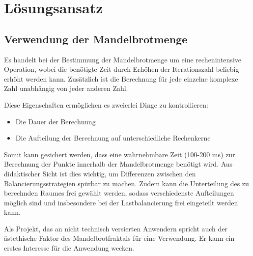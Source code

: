 \section{Lösungsansatz}

\subsection{Verwendung der Mandelbrotmenge}

Es handelt bei der Bestimmung der Mandelbrotmenge um eine rechenintensive Operation, wobei
die benötigte Zeit durch Erhöhen der Iterationszahl beliebig erhöht werden kann.
Zusätzlich ist die Berechnung für jede einzelne komplexe Zahl unabhängig von
jeder anderen Zahl.

Diese Eigenschaften ermöglichen es zweierlei Dinge zu kontrollieren:
\begin{itemize}
	\item Die Dauer der Berechnung
	\item Die Aufteilung der Berechnung auf unterschiedliche Rechenkerne
\end{itemize}

Somit kann gesichert werden, dass eine wahrnehmbare Zeit (100-200 ms) zur Berechnung der Punkte innerhalb
der Mandelbrotmenge benötigt wird.
Aus didaktischer Sicht ist dies wichtig, um Differenzen zwischen den Balancierungsstrategien spürbar zu machen.
Zudem kann die Unterteilung des zu berechnden Raumes frei gewählt werden, sodass
verschiedenste Aufteilungen möglich sind und insbesondere bei der Lastbalancierung frei eingeteilt werden kann.

Als Projekt, das an nicht technisch versierten Anwendern spricht auch der ästethische
Faktor des Mandelbrotfraktals für eine Verwendung.
Er kann ein erstes Interesse für die Anwendung wecken.

